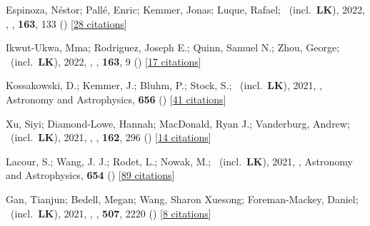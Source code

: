\item[{\color{numcolor}\scriptsize63}] Espinoza, N{\'e}stor; Pall{\'e}, Enric; Kemmer, Jonas; Luque, Rafael; \etal\ (incl.\ \textbf{LK}), 2022, , \aj, \textbf{163}, 133 () [\href{https://ui.adsabs.harvard.edu/abs/2022AJ....163..133E}{28 citations}]

\item[{\color{numcolor}\scriptsize62}] Ikwut-Ukwa, Mma; Rodriguez, Joseph E.; Quinn, Samuel N.; Zhou, George; \etal\ (incl.\ \textbf{LK}), 2022, , \aj, \textbf{163}, 9 () [\href{https://ui.adsabs.harvard.edu/abs/2022AJ....163....9I}{17 citations}]

\item[{\color{numcolor}\scriptsize61}] Kossakowski, D.; Kemmer, J.; Bluhm, P.; Stock, S.; \etal\ (incl.\ \textbf{LK}), 2021, , Astronomy and Astrophysics, \textbf{656} () [\href{https://ui.adsabs.harvard.edu/abs/2021A&A...656A.124K}{41 citations}]

\item[{\color{numcolor}\scriptsize60}] Xu, Siyi; Diamond-Lowe, Hannah; MacDonald, Ryan J.; Vanderburg, Andrew; \etal\ (incl.\ \textbf{LK}), 2021, , \aj, \textbf{162}, 296 () [\href{https://ui.adsabs.harvard.edu/abs/2021AJ....162..296X}{14 citations}]

\item[{\color{numcolor}\scriptsize59}] Lacour, S.; Wang, J. J.; Rodet, L.; Nowak, M.; \etal\ (incl.\ \textbf{LK}), 2021, , Astronomy and Astrophysics, \textbf{654} () [\href{https://ui.adsabs.harvard.edu/abs/2021A&A...654L...2L}{89 citations}]

\item[{\color{numcolor}\scriptsize58}] Gan, Tianjun; Bedell, Megan; Wang, Sharon Xuesong; Foreman-Mackey, Daniel; \etal\ (incl.\ \textbf{LK}), 2021, , \mnras, \textbf{507}, 2220 () [\href{https://ui.adsabs.harvard.edu/abs/2021MNRAS.507.2220G}{8 citations}]


